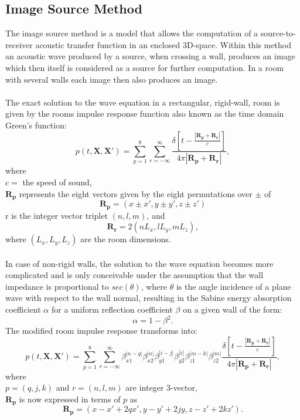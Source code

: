 \subsection{Image Source Method}
The image source method is a model that allows the computation of a source-to-receiver acoustic transfer function in an enclosed 3D-space. Within this method an acoustic wave produced by a source, when crossing a wall, produces an image which then itself is considered as a source for further computation. In a room with several walls each image then also produces an image.\cite{Allen1979}
\\\\
The exact solution to the wave equation in a rectangular, rigid-wall, room is given by the rooms impulse response function also known as the time domain Green's function\cite{Allen1979}:
\begin{equation}
    p(t,\mathbf{X},\mathbf{X'})=\sum_{p=1}^8\sum_{r=-\infty}^\infty\frac{\delta[t-\frac{|\mathbf{R_p}+\mathbf{R_r}|}{c}]}{4\pi|\mathbf{R_p}+\mathbf{R_r}|},
\end{equation}
where\\ 
$c=$ the speed of sound,\\
$\mathbf{R_p}$ represents the eight vectors given by the eight permutations over $\pm$ of
\begin{equation}
    \mathbf{R_p}=(x\pm x', y\pm y', z\pm z')
\end{equation}
r is the integer vector triplet $(n,l,m)$, and
\begin{equation}
    \mathbf{R_r}=2(nL_x, lL_y, mL_z),
\end{equation}
where $(L_x, L_y, L_z)$ are the room dimensions.
\\
\\
In case of non-rigid walls, the solution to the wave equation becomes more complicated and is only conceivable under the assumption that the wall impedance is proportional to $sec(\theta)$, where $\theta$ is the angle incidence of a plane wave with respect to the wall normal, resulting in the Sabine energy absorption coefficient $\alpha$ for a uniform reflection coefficient $\beta$ on a given wall of the form\cite{Allen1979}:
\begin{equation}
    \alpha=1-\beta^2.
\end{equation}
The modified room impulse response transforms into:
\begin{equation}
    p(t,\mathbf{X},\mathbf{X'})=\sum_{p=1}^8\sum_{r=-\infty}^\infty
    \beta_{x1}^{|n-q|}\beta_{x2}^{|n|}\beta_{y1}^{|i-j|}\beta_{y2}^{|i|}\beta_{z1}^{|m-k|}\beta_{z2}^{|m|}
    \frac{\delta[t-\frac{|\mathbf{R_p}+\mathbf{R_r}|}{c}]}{4\pi|\mathbf{R_p}+\mathbf{R_r}|},
\end{equation}
where\\
$p=(q,j,k)$ and $r=(n,l,m)$ are integer 3-vector,\\
$\mathbf{R_p}$ is now expressed in terms of $p$ as
\begin{equation}
    \mathbf{R_p}=(x-x'+2qx', y-y'+2jy,z-z'+2kz').
\end{equation}

